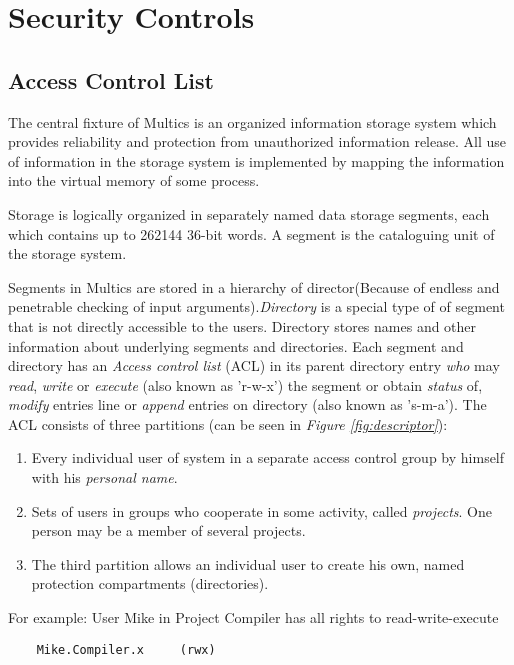 \section{Security Controls}


\subsection{Access Control List}

The central fixture of Multics is an organized information storage system which provides reliability and 
protection from unauthorized information release. All use of information in the storage system is implemented 
by mapping the information into the virtual memory of some process. 

Storage is logically organized in separately 
named data storage segments, each which contains up to 262144 36-bit words. A segment is the cataloguing unit of 
the storage system.

Segments in Multics are stored in a hierarchy of director(Because of endless and penetrable checking of input arguments).\textit{Directory} is a special type of of
segment that is not directly accessible to the users.
Directory stores names and other information about underlying segments and directories.
Each segment and directory has an \textit{Access control list} (ACL) in its parent directory entry
\textit{who} may \textit{read}, \textit{write} or \textit{execute} (also known as 'r-w-x') the segment or obtain 
\textit{status} of, \textit{modify} entries line or \textit{append} entries on directory (also known as 's-m-a').
The ACL consists of three partitions (can be seen in \textit{Figure \ref{fig:descriptor}}):
\begin{enumerate}
    \item Every individual user of system in a separate access control group by himself with his \textit{personal name}.
    \item Sets of users in groups who cooperate in some activity, called \textit{projects}. One person may be a member of 
    several projects.
    \item  The third partition allows an individual user to create his own, named protection compartments (directories).
\end{enumerate}

For example:
User Mike in Project Compiler has all rights to read-write-execute
\begin{lstlisting}
    Mike.Compiler.x     (rwx)
\end{lstlisting}

